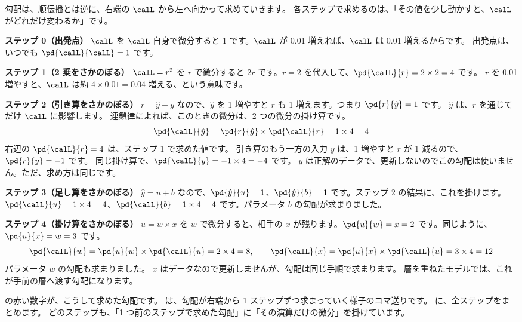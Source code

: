 勾配は、順伝播とは逆に、右端の $\calL$ から左へ向かって求めていきます。
各ステップで求めるのは、「その値を少し動かすと、$\calL$ がどれだけ変わるか」です。

\textbf{ステップ 0（出発点）}\quad
$\calL$ を $\calL$ 自身で微分すると 1 です。$\calL$ が 0.01 増えれば、$\calL$ は 0.01 増えるからです。
出発点は、いつでも $\pd{\calL}{\calL}=1$ です。

\textbf{ステップ 1（2 乗をさかのぼる）}\quad
$\calL=r^2$ を $r$ で微分すると $2r$ です。$r=2$ を代入して、$\pd{\calL}{r}=2\times 2=4$ です。
$r$ を 0.01 増やすと、$\calL$ は約 $4\times 0.01=0.04$ 増える、という意味です。

\textbf{ステップ 2（引き算をさかのぼる）}\quad
$r=\hat y-y$ なので、$\hat y$ を 1 増やすと $r$ も 1 増えます。つまり $\pd{r}{\hat y}=1$ です。
$\hat y$ は、$r$ を通じてだけ $\calL$ に影響します。
連鎖律によれば、このときの微分は、2 つの微分の掛け算です。
\[
\pd{\calL}{\hat y}=\pd{r}{\hat y}\times\pd{\calL}{r}=1\times 4=4
\]
右辺の $\pd{\calL}{r}=4$ は、ステップ 1 で求めた値です。
引き算のもう一方の入力 $y$ は、1 増やすと $r$ が 1 減るので、$\pd{r}{y}=-1$ です。
同じ掛け算で、$\pd{\calL}{y}=-1\times 4=-4$ です。
$y$ は正解のデータで、更新しないのでこの勾配は使いません。ただ、求め方は同じです。

\textbf{ステップ 3（足し算をさかのぼる）}\quad
$\hat y=u+b$ なので、$\pd{\hat y}{u}=1$、$\pd{\hat y}{b}=1$ です。ステップ 2 の結果に、これを掛けます。
$\pd{\calL}{u}=1\times 4=4$、$\pd{\calL}{b}=1\times 4=4$ です。パラメータ $b$ の勾配が求まりました。

\textbf{ステップ 4（掛け算をさかのぼる）}\quad
$u=w\times x$ を $w$ で微分すると、相手の $x$ が残ります。$\pd{u}{w}=x=2$ です。同じように、$\pd{u}{x}=w=3$ です。
\[
\pd{\calL}{w}=\pd{u}{w}\times\pd{\calL}{u}=2\times 4=8,\qquad
\pd{\calL}{x}=\pd{u}{x}\times\pd{\calL}{u}=3\times 4=12
\]
パラメータ $w$ の勾配も求まりました。
$x$ はデータなので更新しませんが、勾配は同じ手順で求まります。
層を重ねたモデルでは、これが手前の層へ渡す勾配になります。

の赤い数字が、こうして求めた勾配です。
は、勾配が右端から 1 ステップずつ求まっていく様子のコマ送りです。
に、全ステップをまとめます。
どのステップも、「1 つ前のステップで求めた勾配」に「その演算だけの微分」を掛けています。

